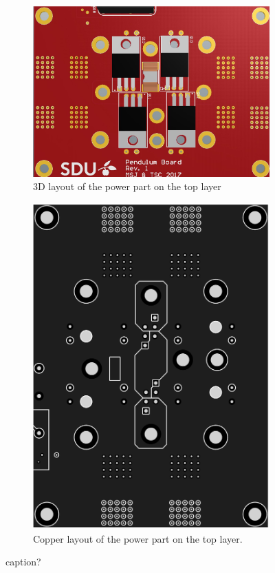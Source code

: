 \begin{figure}
	\centering
	\begin{subfigure}[b]{0.49\textwidth}
		\centering
		\includegraphics[angle=90,width=\linewidth]{graphics/power_layout_3}
		\caption{3D layout of the power part on the top layer}
		\label{sfig:power_layout_3}
	\end{subfigure}
	\begin{subfigure}[b]{0.49\textwidth} 
		\centering
		\includegraphics[width=\linewidth]{graphics/power_layout}
		\caption{Copper layout of the power part on the top layer.}
		\label{sfig:power_layout_2}
	\end{subfigure}
	\caption{caption?}
	\label{fig:power_layout}
\end{figure}

